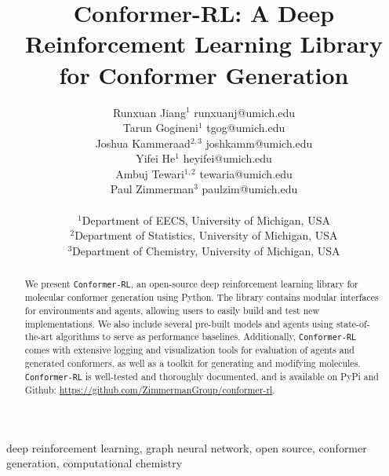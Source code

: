 \documentclass[twoside,11pt]{article}
\newcommand{\code}[1]{\texttt{#1}}
\newcommand{\titleofpaper}{Conformer-RL}
\begin{document}
\title{\titleofpaper: A Deep Reinforcement Learning Library for Conformer Generation}

\author{\name Runxuan Jiang$^1$ \email runxuanj@umich.edu \\
       \name Tarun Gogineni$^1$ \email tgog@umich.edu \\
       \name Joshua Kammeraad$^{2, 3}$ \email joshkamm@umich.edu\\
       \name  Yifei He$^1$ \email heyifei@umich.edu \\
       \name Ambuj Tewari$^{1, 2}$ \email tewaria@umich.edu\\
       \name Paul Zimmerman$^3$ \email paulzim@umich.edu\\
       \\
       \addr $^1$Department of EECS, University of Michigan, USA\\
       \addr $^2$Department of Statistics, University of Michigan, USA\\
       \addr $^3$Department of Chemistry, University of Michigan, USA
}


\maketitle


\begin{abstract}%
  We present \code{\titleofpaper}, an open-source deep reinforcement learning library for molecular conformer generation using Python. The library contains modular interfaces for environments and agents, allowing users to easily build and test new implementations. We also include several pre-built models and agents using state-of-the-art algorithms to serve as performance baselines. Additionally, \code{\titleofpaper} comes with extensive logging and visualization tools for evaluation of agents and generated conformers, as well as a toolkit for generating and modifying molecules. \code{\titleofpaper} is well-tested and thoroughly documented, and is available on PyPi and Github: \url{https://github.com/ZimmermanGroup/conformer-rl}.
\end{abstract}

\begin{keywords}
  deep reinforcement learning, graph neural network, open source, conformer generation, computational chemistry
\end{keywords}
\end{document}
